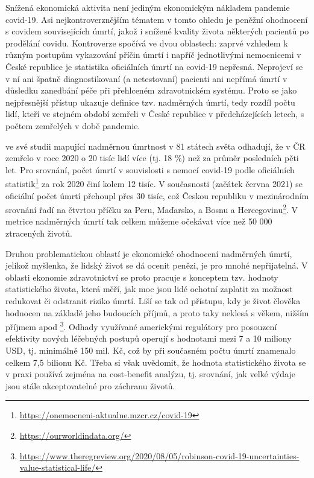 Snížená ekonomická aktivita není jediným ekonomickým nákladem pandemie covid-19. Asi nejkontroverznějším tématem v tomto ohledu je peněžní ohodnocení s covidem souvisejících úmrtí, jakož i snížené kvality života některých pacientů po prodělání covidu. Kontroverze spočívá ve dvou oblastech: zaprvé vzhledem k různým postupům vykazování příčin úmrtí i napříč jednotlivými nemocnicemi v České republice je statistika oficiálních úmrtí na covid-19 nepřesná. Neprojeví se v ní ani špatně diagnostikovaní (a netestovaní) pacienti ani nepřímá úmrtí v důsledku zanedbání péče při přehlceném zdravotnickém systému. Proto se jako nejpřesnější přístup ukazuje definice tzv. nadměrných úmrtí, tedy rozdíl počtu lidí, kteří ve stejném období zemřeli v České republice v předcházejících letech, s počtem zemřelých v době pandemie. 

\cite{Karlinsky2021} ve své studii mapující nadměrnou úmrtnost v 81 státech světa odhadují, že v ČR zemřelo v roce 2020 o 20 tisíc lidí více (tj. 18 \%) než za průměr posledních pěti let. Pro srovnání, počet úmrtí v souvislosti s nemocí covid-19 podle oficiálních statistik\footnote{\url{https://onemocneni-aktualne.mzcr.cz/covid-19}} za rok 2020 činí kolem 12 tisíc. V současnosti (začátek června 2021) se oficiální počet úmrtí přehoupl přes 30 tisíc, což Českou republiku v mezinárodním srovnání řadí na čtvrtou příčku za Peru, Maďarsko, a Bosnu a Hercegovinu\footnote{\url{https://ourworldindata.org/}}. V metrice nadměrných úmrtí tak celkem můžeme očekávat více než 50 000 ztracených životů.

Druhou problematickou oblastí je ekonomické ohodnocení nadměrných úmrtí, jelikož myšlenka, že lidský život se dá ocenit penězi, je pro mnohé nepřijatelná. V oblasti ekonomie zdravotnictví se proto pracuje s konceptem tzv. hodnoty statistického života, která měří, jak moc jsou lidé ochotní zaplatit za možnost redukovat či odstranit riziko úmrtí. Liší se tak od přístupu, kdy je život člověka hodnocen na základě jeho budoucích příjmů, a proto taky neklesá s věkem, nižším příjmem apod \footnote{\url{https://www.theregreview.org/2020/08/05/robinson-covid-19-uncertainties-value-statistical-life/}}. Odhady využívané americkými regulátory pro posouzení efektivity nových léčebných postupů operují s hodnotami mezi 7 a 10 miliony USD, tj. minimálně 150 mil. Kč, což by při současném počtu úmrtí znamenalo celkem 7,5 bilionu Kč. Třeba si však uvědomit, že hodnota statistického života se v praxi používá zejména na cost-benefit analýzu, tj. srovnání, jak velké výdaje jsou stále akceptovatelné pro záchranu životů.

